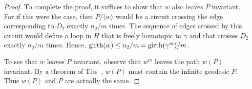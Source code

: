 \begin{proof}
To complete the proof, it suffices to show that $w$ also leaves $P$ invariant.  For if this were the case, then $P/\langle w\rangle$ would be a circuit crossing the edge corresponding to $D_{2}$ exactly $n_{2}/m$ times.  The sequence of edges crossed by this circuit would define a loop in $H$ that is freely homotopic to $\gamma$ and that crosses $D_{2}$ exactly $n_{2}/m$ times.  Hence, $\operatorname{girth}(w)\leq n_{2}/m=\operatorname{girth}(\gamma^{m})/m$.

To see that $w$ leaves $P$ invariant, observe that $w^{m}$ leaves the path $w(P)$ invariant.  By a theorem of Tits~\cite[Prop. 24]{Se}, $w(P)$ must contain the infinite geodesic $P$.  Thus $w(P)$ and $P$ are actually the same.
\end{proof}